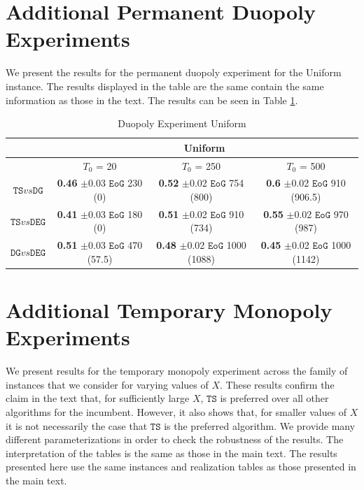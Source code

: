 \documentclass[11pt,letterpaper]{article}
\theoremstyle{definition}
\newcommand{\term}[1]{\ensuremath{\mathtt{#1}}\xspace}
\newcommand{\TS}{\term{TS}}
\newcommand{\DEG}{\term{DEG}}
\newcommand{\DG}{\term{DG}}
\newcommand{\Eeog}{\term{EoG}} %
\begin{document}
\section{Additional Permanent Duopoly Experiments}

We present the results for the permanent duopoly experiment for the Uniform instance. The results displayed in the table are the same contain the same information as those in the text. The results can be seen in Table \ref{duopoly_unif}.

\begin{table}[h]
\centering
\begin{tabular}{|c|c|c|c|}
  \hline
  & \multicolumn{3}{c|}{Uniform} \\
\hline
   & $T_0$ = 20 & $T_0$ = 250 & $T_0$ = 500 \\ \hline
$\TS vs \DG$
  & \makecell{\textbf{0.46} $\pm$0.03\\ \Eeog 230 (0)}
    & \makecell{\textbf{0.52} $\pm$0.02\\ \Eeog 754 (800)}
    & \makecell{\textbf{0.6} $\pm$0.02\\ \Eeog 910 (906.5)} \\ \hline
$\TS vs \DEG$
    & \makecell{\textbf{0.41} $\pm$0.03 \\ \Eeog 180 (0)}
    & \makecell{\textbf{0.51} $\pm$0.02 \\ \Eeog 910 (734)}
    & \makecell{\textbf{0.55} $\pm$0.02 \\ \Eeog 970 (987)} \\ \hline
$\DG vs \DEG$
    & \makecell{\textbf{0.51} $\pm$0.03 \\ \Eeog 470 (57.5)}
    & \makecell{\textbf{0.48} $\pm$0.02 \\ \Eeog 1000 (1088)}
    & \makecell{\textbf{0.45} $\pm$0.02 \\ \Eeog 1000 (1142)} \\\hline
\end{tabular}
\caption{Duopoly Experiment Uniform}
\label{duopoly_unif}
\end{table}

\section{Additional Temporary Monopoly Experiments}

We present results for the temporary monopoly experiment across the family of instances that we consider for varying values of $X$. These results confirm the claim in the text that, for sufficiently large $X$, $\TS$ is preferred over all other algorithms for the incumbent. However, it also shows that, for smaller values of $X$ it is not necessarily the case that $\TS$ is the preferred algorithm. We provide many different parameterizations in order to check the robustness of the results. The interpretation of the tables is the same as those in the main text. The results presented here use the same instances and realization tables as those presented in the main text. 
\end{document}
